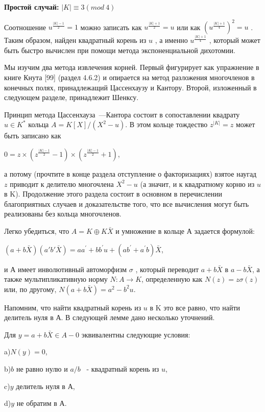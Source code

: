 \documentclass{mai_book}
\begin{document}
{\bf Простой случай:} $|K| \equiv 3 (mod \ 4)$

Соотношение $u^{\frac{|K|-1}{2}} = 1$
 можно записать как $u^{\frac{|K|+1}{2}} = u$
 или как $(u^{\frac{|K|+1}{4}})^2 = u$
 . Таким образом, найден квадратный корень из $u$
, а именно $u^{\frac{|K|+1}{4}}$
, который может быть быстро вычислен при помощи метода экспоненциальной дихотомии.


Мы изучим два метода извлечения корней. Первый фигурирует как упражнение в книге Кнута [99] (раздел 4.6.2) и опирается на метод разложения многочленов в конечных полях, принадлежащий Цассенхаузу и Кантору. Второй, изложенный в следующем разделе, принадлежит Шенксу.

\newpage

Принцип метода Цассенхауза~---Кантора состоит в сопоставлении квадрату $u \in K^*$
 кольца $A = K[X]/(X^2 - u)$. В этом кольце тождество $z^{|K|} = z$
 может быть записано как

\begin{center}
$0 = z \times (z^{\frac{|K|-1}{2}} - 1) \times (z^{\frac{|K|-1}{2}} +1)$,
\end{center}


а потому (прочтите в конце раздела отступление о факторизациях) взятое наугад $z$ приводит к делителю многочлена $X^2 - u$
 (а значит, и к квадратному корню из $u$
 в K). Продолжение этого раздела состоит в основном в перечислении благоприятных случаев и доказательстве того, что все вычисления могут быть реализованы без кольца многочленов.

Легко убедиться, что $A = K\oplus K \bar X$
 и умножение в кольце А задается формулой:

\begin{center}
$(a + b \bar X)(a\prime b\prime \bar X) = aa^{\prime} + bb^{\prime} u + (ab^{\prime} + a^{\prime} b) \bar X$,
\end{center}


и А имеет инволютивный автоморфизм $\sigma$
, который переводит $a + b \bar X$
 в $a - b \bar X$, а также мультипликативную норму $N : A \rightarrow K$, определенную как $N(z) = z \sigma (z)$
 или, по другому, $N(a+b \bar X) = a^2 - b^2u$.

Напомним, что найти квадратный корень из $u$
 в K это все равно, что найти делитель нуля в А. В следующей лемме дано несколько уточнений.

\begin{lemma}
Для $y = a+b \bar X \in A - {0}$
 эквивалентны следующие условия:

a)$N(y) = 0$,

b)$b$ не равно нулю и $a/b$
 ~- квадратный корень из $u$,

c)$y$ делитель нуля в А,

d)$y$ не обратим в А.
\end{lemma}
\end{document}
